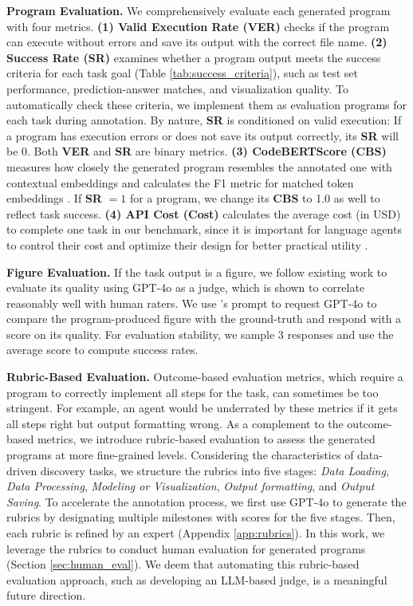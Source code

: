 \documentclass{article} %
\begin{document}


%
\textbf{Program Evaluation.} 
We comprehensively evaluate each generated program with four metrics.
\textbf{(1) Valid Execution Rate (VER)} checks if the program can execute without errors and save its output with the correct file name.
\textbf{(2) Success Rate (SR)} examines whether a program output meets the success criteria for each task goal (Table \ref{tab:success_criteria}), such as test set performance, prediction-answer matches, and visualization quality. 
To automatically check these criteria, we implement them as evaluation programs for each task during annotation.
By nature, \textbf{SR} is conditioned on valid execution: 
If a program has execution errors or does not save its output correctly, its \textbf{SR} will be 0.
Both \textbf{VER} and \textbf{SR} are binary metrics.
\textbf{(3) CodeBERTScore (CBS)} measures how closely the generated program resembles the annotated one with contextual embeddings and calculates the F1 metric for matched token embeddings \citep{zhou-etal-2023-codebertscore}.
If \textbf{SR} $= 1$ for a program, we change its \textbf{CBS} to 1.0 as well to reflect task success.
\textbf{(4) API Cost (Cost)} calculates the average cost (in USD) to complete one task in our benchmark, since it is important for language agents to control their cost and optimize their design for better practical utility \citep{kapoor2024aiagentsmatter}. 
%

%
\textbf{Figure Evaluation.}
If the task output is a figure, we follow existing work \citep{wu2024plot2codecomprehensivebenchmarkevaluating, yang2024matplotagentmethodevaluationllmbased} to evaluate its quality using GPT-4o as a judge, which is shown to correlate reasonably well with human raters.
We use \citet{yang2024matplotagentmethodevaluationllmbased}'s prompt to request GPT-4o to 
compare the program-produced figure with the ground-truth and respond with a score on its quality.
For evaluation stability, we sample 3 responses and use the average score to compute success rates.
%

%
\textbf{Rubric-Based Evaluation.} 
Outcome-based evaluation metrics, which require a program to correctly implement all steps for the task, can sometimes be too stringent.
For example, an agent would be underrated by these metrics if it gets all steps right but output formatting wrong.
As a complement to the outcome-based metrics, we introduce rubric-based evaluation to assess the generated programs at more fine-grained levels.
Considering the characteristics of data-driven discovery tasks, we structure the rubrics into five stages: \textit{Data Loading}, \textit{Data Processing}, \textit{Modeling or Visualization}, \textit{Output formatting}, and \textit{Output Saving}.
To accelerate the annotation process, we first use GPT-4o to generate the rubrics by designating multiple milestones with scores for the five stages.
Then, each rubric is refined by an expert (Appendix \ref{app:rubrics}).
In this work, we leverage the rubrics to conduct human evaluation for generated programs (Section \ref{sec:human_eval}).
We deem that automating this rubric-based evaluation approach, such as developing an LLM-based judge, is a meaningful future direction.
%
\end{document}
